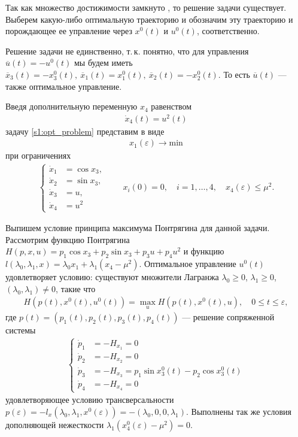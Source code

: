 \documentclass[../main.tex]{subfiles}
\begin{document}
Так как множество достижимости замкнуто \cite{GusZykIFAC}, то решение задачи существует. 
Выберем какую-либо оптимальную траекторию и обозначим эту траекторию и порождающее ее управление через $x^0(t) $ и $ u^0(t) $, соответственно.

Решение задачи не единственно, т.\,к. понятно, что для управления $ \overline{u}(t) = -u^0(t) $ мы будем иметь $ \overline{x}_3(t) = -x_3^0(t), \ \overline{x}_1(t) = x_1^0(t), \ \overline{x}_2(t) = -x_2^0(t) $. 
То есть $ \overline{u}(t) $ --- также оптимальное управление.

Введя дополнительную переменную $ x_4 $ равенством
\begin{gather*}
	\dot{x}_4(t) = u^2(t)
\end{gather*}
задачу \eqref{s1:opt_problem} представим в виде
\begin{gather*}%
	x_1(\varepsilon) \rightarrow \mathrm{min}
\end{gather*}
при ограничениях
\begin{gather}\label{s1:system2}
	\left\{
	\begin{aligned}
		\dot{x}_1 &= \cos x_3, \\
		\dot{x}_2 &= \sin x_3, \\
		\dot{x}_3 &= u, \\
		\dot{x}_4 &= u^2
	\end{aligned}
	\right.
	\qquad
	x_i(0) = 0, \quad i = 1, \dots, 4,
	\quad
	{x_4}\left( \varepsilon \right) \le {\mu ^2}.
\end{gather}

Выпишем условие принципа максимума Понтрягина для данной задачи. 
Рассмотрим функцию Понтрягина
$
	H(p,x,u) = p_1 \cos{x_3} + p_2 \sin {x_3} + p_3 u + p_4 u^2
$
и функцию
$
	l(\lambda_0,\lambda_1,x) = \lambda_0 x_1 + \lambda_1 (x_4 - \mu^2).
$
Оптимальное управление $ u^0(t) $ удовлетворяет условию: существуют множители Лагранжа $ \lambda_0 \geq 0 $, $ \lambda_1 \geqslant 0 $, $ (\lambda_0,\lambda_1) \neq 0 $, такие что
\begin{gather*}
	H(p(t),x^0(t),u^0(t))=\max_u H(p(t),x^0(t),u), \quad 0\leqslant t \leqslant \varepsilon,
\end{gather*}
где $ p(t) = \left(p_1(t),p_2(t),p_3(t),p_4(t) \right) $ --- решение сопряженной системы
\begin{gather*}
		\left\{ \begin{aligned}
						\dot{p}_1 &= -H_{x_1} = 0\\
						\dot{p}_2 &= -H_{x_2} = 0\\
						\dot{p}_3 &= -H_{x_3} = p_1 \sin x_3^0(t) - p_2 \cos x_3^0(t)\\
						\dot{p}_4 &= -H_{x_4} = 0
		\end{aligned} \right.
\end{gather*}
удовлетворяющее условию трансверсальности
$
p(\varepsilon) = -l_x(\lambda_0,\lambda_1, x^0(\varepsilon)) = - (\lambda_0,0,0,\lambda_1).
$
Выполнены так же условия дополняющей нежесткости
$\lambda_1 (x_4^0(\varepsilon) - \mu^2) = 0$.
\end{document}
